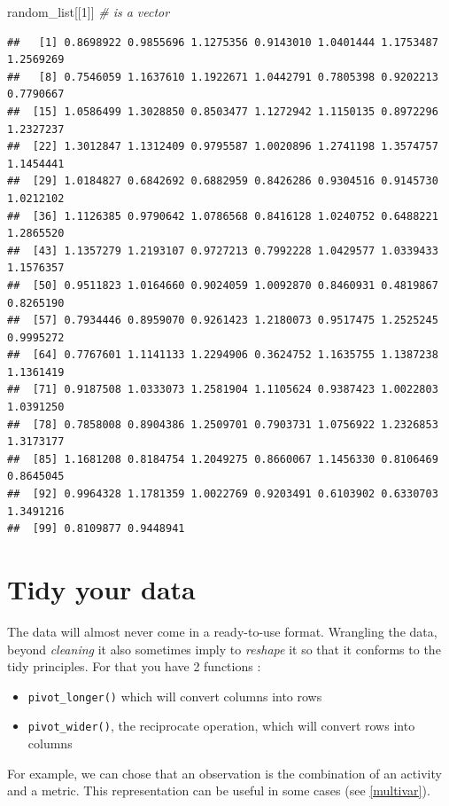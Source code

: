 \documentclass[
]{book}
\newenvironment{Shaded}{\begin{snugshade}}{\end{snugshade}}
\newcommand{\CommentTok}[1]{\textcolor[rgb]{0.56,0.35,0.01}{\textit{#1}}}
\newcommand{\DecValTok}[1]{\textcolor[rgb]{0.00,0.00,0.81}{#1}}
\newcommand{\NormalTok}[1]{#1}
\providecommand{\tightlist}{%
  \setlength{\itemsep}{0pt}\setlength{\parskip}{0pt}}
\begin{document}
\begin{Shaded}
\begin{Highlighting}[]
\NormalTok{random_list[[}\DecValTok{1}\NormalTok{]] }\CommentTok{# is a vector}
\end{Highlighting}
\end{Shaded}

\begin{verbatim}
##   [1] 0.8698922 0.9855696 1.1275356 0.9143010 1.0401444 1.1753487 1.2569269
##   [8] 0.7546059 1.1637610 1.1922671 1.0442791 0.7805398 0.9202213 0.7790667
##  [15] 1.0586499 1.3028850 0.8503477 1.1272942 1.1150135 0.8972296 1.2327237
##  [22] 1.3012847 1.1312409 0.9795587 1.0020896 1.2741198 1.3574757 1.1454441
##  [29] 1.0184827 0.6842692 0.6882959 0.8426286 0.9304516 0.9145730 1.0212102
##  [36] 1.1126385 0.9790642 1.0786568 0.8416128 1.0240752 0.6488221 1.2865520
##  [43] 1.1357279 1.2193107 0.9727213 0.7992228 1.0429577 1.0339433 1.1576357
##  [50] 0.9511823 1.0164660 0.9024059 1.0092870 0.8460931 0.4819867 0.8265190
##  [57] 0.7934446 0.8959070 0.9261423 1.2180073 0.9517475 1.2525245 0.9995272
##  [64] 0.7767601 1.1141133 1.2294906 0.3624752 1.1635755 1.1387238 1.1361419
##  [71] 0.9187508 1.0333073 1.2581904 1.1105624 0.9387423 1.0022803 1.0391250
##  [78] 0.7858008 0.8904386 1.2509701 0.7903731 1.0756922 1.2326853 1.3173177
##  [85] 1.1681208 0.8184754 1.2049275 0.8660067 1.1456330 0.8106469 0.8645045
##  [92] 0.9964328 1.1781359 1.0022769 0.9203491 0.6103902 0.6330703 1.3491216
##  [99] 0.8109877 0.9448941
\end{verbatim}

\hypertarget{tidy-your-data}{%
\section{Tidy your data}\label{tidy-your-data}}

The data will almost never come in a ready-to-use format. Wrangling the data, beyond \emph{cleaning} it also sometimes imply to \emph{reshape} it so that it conforms to the tidy principles. For that you have 2 functions :

\begin{itemize}
\tightlist
\item
  \texttt{pivot\_longer()} which will convert columns into rows
\item
  \texttt{pivot\_wider()}, the reciprocate operation, which will convert rows into columns
\end{itemize}

For example, we can chose that an observation is the combination of an activity and a metric. This representation can be useful in some cases (see \ref{multivar}).
\end{document}
